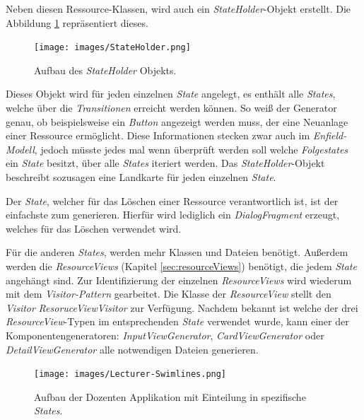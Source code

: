 Neben diesen Ressource-Klassen, wird auch ein \textit{StateHolder}-Objekt erstellt. Die Abbildung \ref{fig:stateHolder} repräsentiert dieses. 

\begin{figure}[H]
	\begin{center}
		\texttt{[image: images/StateHolder.png]}
		\caption{Aufbau des \textit{StateHolder} Objekts.}
		\label{fig:stateHolder}
	\end{center}
\end{figure}

Dieses Objekt wird für jeden einzelnen \textit{State} angelegt, es enthält alle \textit{States}, welche über die \textit{Transitionen} erreicht werden können.
So weiß der Generator genau, ob beispielsweise ein \textit{Button} angezeigt werden muss, der eine Neuanlage einer Ressource ermöglicht. Diese Informationen stecken zwar auch im \textit{Enfield-Modell}, jedoch müsste jedes mal wenn überprüft werden soll welche \textit{Folgestates} ein \textit{State} besitzt, über alle \textit{States} iteriert werden. Das \textit{StateHolder}-Objekt beschreibt sozusagen eine Landkarte für jeden einzelnen \textit{State}.

Der \textit{State}, welcher für das Löschen einer Ressource verantwortlich ist, ist der einfachste zum generieren. Hierfür wird lediglich ein \textit{DialogFragment} erzeugt, welches für das Löschen verwendet wird. 

Für die anderen \textit{States}, werden mehr Klassen und Dateien benötigt. Außerdem werden die \textit{ResourceViews} (Kapitel \ref{sec:resourceViews}) benötigt, die jedem \textit{State} angehängt sind. Zur Identifizierung der einzelnen \textit{ResourceViews} wird wiederum mit dem \textit{Visitor-Pattern} gearbeitet. Die Klasse der \textit{ResourceView} stellt den \textit{Visitor} \textit{ResoruceViewVisitor} zur Verfügung. 
Nachdem bekannt ist welche der drei \textit{ResourceView}-Typen im entsprechenden \textit{State} verwendet wurde, kann einer der Komponentengeneratoren: \textit{InputViewGenerator}, \textit{CardViewGenerator} oder \textit{DetailViewGenerator} alle notwendigen Dateien generieren.

\begin{figure}[H]
	\begin{center}
		\texttt{[image: images/Lecturer-Swimlines.png]}
		\caption{Aufbau der Dozenten Applikation mit Einteilung in spezifische \textit{States}.}
		\label{fig:swimlines}
	\end{center}
\end{figure}


